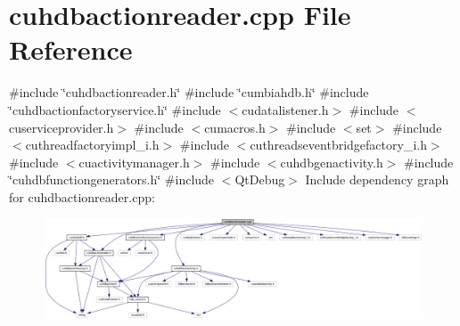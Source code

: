 \section{cuhdbactionreader.\+cpp File Reference}
\label{cuhdbactionreader_8cpp}
{\ttfamily \#include \char`\"{}cuhdbactionreader.\+h\char`\"{}}\newline
{\ttfamily \#include \char`\"{}cumbiahdb.\+h\char`\"{}}\newline
{\ttfamily \#include \char`\"{}cuhdbactionfactoryservice.\+h\char`\"{}}\newline
{\ttfamily \#include $<$cudatalistener.\+h$>$}\newline
{\ttfamily \#include $<$cuserviceprovider.\+h$>$}\newline
{\ttfamily \#include $<$cumacros.\+h$>$}\newline
{\ttfamily \#include $<$set$>$}\newline
{\ttfamily \#include $<$cuthreadfactoryimpl\+\_\+i.\+h$>$}\newline
{\ttfamily \#include $<$cuthreadseventbridgefactory\+\_\+i.\+h$>$}\newline
{\ttfamily \#include $<$cuactivitymanager.\+h$>$}\newline
{\ttfamily \#include $<$cuhdbgenactivity.\+h$>$}\newline
{\ttfamily \#include \char`\"{}cuhdbfunctiongenerators.\+h\char`\"{}}\newline
{\ttfamily \#include $<$Qt\+Debug$>$}\newline
Include dependency graph for cuhdbactionreader.\+cpp\+:
\nopagebreak
\begin{figure}[H]
\begin{center}
\leavevmode
\includegraphics[width=350pt]{cuhdbactionreader_8cpp__incl}
\end{center}
\end{figure}
